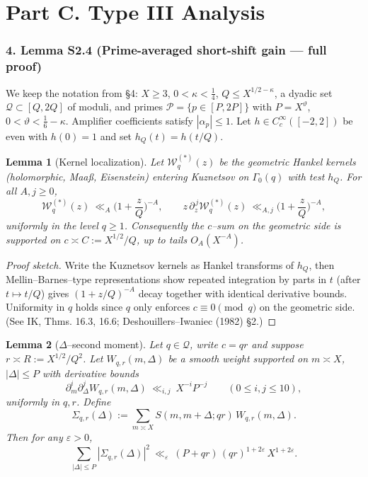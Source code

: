 \documentclass[11pt]{article}
\newtheorem{lemma}{Lemma}[section]
\theoremstyle{definition}
\theoremstyle{remark}
\begin{document}
\part*{Part C. Type III Analysis}

\section*{4. Lemma S2.4 (Prime-averaged short-shift gain — full proof)}

We keep the notation from §4: $X\ge 3$, $0<\kappa<\tfrac14$, $Q\le X^{1/2-\kappa}$, a dyadic set $\mathcal Q\subset[Q,2Q]$ of moduli, and primes $\mathcal P=\{p\in[P,2P]\}$ with $P=X^\vartheta$, $0<\vartheta<\tfrac16-\kappa$. Amplifier coefficients satisfy $|\alpha_p|\le 1$. Let $h\in C_c^\infty([-2,2])$ be even with $h(0)=1$ and set $h_Q(t)=h(t/Q)$.

\begin{lemma}[Kernel localization]\label{lem:kernel-localization}
	Let $\mathcal W_q^{(*)}(z)$ be the geometric Hankel kernels (holomorphic, Maaß, Eisenstein) entering Kuznetsov on $\Gamma_0(q)$ with test $h_Q$. For all $A,j\ge 0$,
	\[
		\mathcal W_q^{(*)}(z)\ \ll_A \Big(1+\frac{z}{Q}\Big)^{-A},
		\qquad
		z\,\partial_z^{\,j}\mathcal W_q^{(*)}(z)\ \ll_{A,j} \Big(1+\frac{z}{Q}\Big)^{-A},
	\]
	uniformly in the level $q\ge 1$. Consequently the $c$–sum on the geometric side is supported on $c\asymp C:=X^{1/2}/Q$, up to tails $O_A(X^{-A})$.
\end{lemma}

\begin{proof}[Proof sketch]
	Write the Kuznetsov kernels as Hankel transforms of $h_Q$, then Mellin–Barnes–type representations show repeated integration by parts in $t$ (after $t\mapsto t/Q$) gives $(1+z/Q)^{-A}$ decay together with identical derivative bounds. Uniformity in $q$ holds since $q$ only enforces $c\equiv 0\pmod q$ on the geometric side. (See IK, Thms. 16.3, 16.6; Deshouillers–Iwaniec (1982) §2.)
\end{proof}

\begin{lemma}[$\Delta$–second moment]\label{lem:delta-second-moment-full}
	Let $q\in\mathcal Q$, write $c=qr$ and suppose $r\asymp R:=X^{1/2}/Q^2$. Let $W_{q,r}(m,\Delta)$ be a smooth weight supported on $m\asymp X$, $|\Delta|\le P$ with derivative bounds
	\[
		\partial_m^i\partial_\Delta^j W_{q,r}(m,\Delta)\ \ll_{i,j}\ X^{-i}P^{-j}\qquad(0\le i,j\le 10),
	\]
	uniformly in $q,r$. Define
	\[
		\Sigma_{q,r}(\Delta):=\sum_{m\asymp X} S(m,m+\Delta;qr)\,W_{q,r}(m,\Delta).
	\]
	Then for any $\varepsilon>0$,
	\[
		\sum_{|\Delta|\le P}\!|\Sigma_{q,r}(\Delta)|^2 \ \ll_{\varepsilon}\ (P+qr)\,(qr)^{1+2\varepsilon}\,X^{1+2\varepsilon}.
	\]
\end{lemma}
\end{document}

